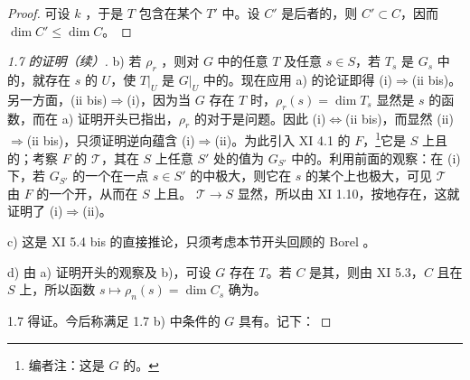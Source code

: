 \begin{proof}
可设 $k$ ，于是 $T$ 包含在某个 $T'$ 中。设 $C'$ 是后者的，则 $C'\subset C$，因而 $\dim C'\leq\dim C$。
\end{proof}
\begin{proof}[ 1.7 的证明（续）]
b) 若 $\rho_r$ ，则对 $G$ 中的任意 $T$ 及任意 $s\in S$，若 $T_s$ 是 $G_s$ 中的，就存在 $s$ 的 $U$，使 $T|_U$ 是 $G|_U$ 中的。现在应用 a) 的论证即得 (i)$\Rightarrow$(ii bis)。另一方面，(ii bis)$\Rightarrow$(i)，因为当 $G$ 存在 $T$ 时，$\rho_r(s)=\dim T_s$ 显然是 $s$ 的函数，而在 a) 证明开头已指出，$\rho_r$ 的对于是问题。因此 (i)$\Leftrightarrow$(ii bis)，而显然 (ii)$\Rightarrow$(ii bis)，只须证明逆向蕴含 (i)$\Rightarrow$(ii)。为此引入 XI 4.1 的 $F$，\footnote[3]{编者注：这是 $G$ 的。}它是 $S$ 上且的；考察 $F$ 的 $\mathcal T$，其在 $S$ 上任意 $S'$ 处的值为 $G_{S'}$ 中的。利用前面的观察：在 (i) 下，若 $G_{S'}$ 的一个在一点 $s\in S'$ 的中极大，则它在 $s$ 的某个上也极大，可见 $\mathcal T$ 由 $F$ 的一个开，从而在 $S$ 上且。 $\mathcal T\to S$ 显然，所以由 XI 1.10，按地存在，这就证明了 (i)$\Rightarrow$(ii)。

 c) 这是 XI 5.4 bis 的直接推论，只须考虑本节开头回顾的 Borel 。

 d) 由 a) 证明开头的观察及 b)，可设 $G$ 存在 $T$。若 $C$ 是其，则由 XI 5.3，$C$ 且在 $S$ 上，所以函数 $s\mapsto\rho_n(s)=\dim C_s$ 确为。

 1.7 得证。今后称满足 1.7 b) 中条件的 $G$ 具有。记下：
\end{proof}
